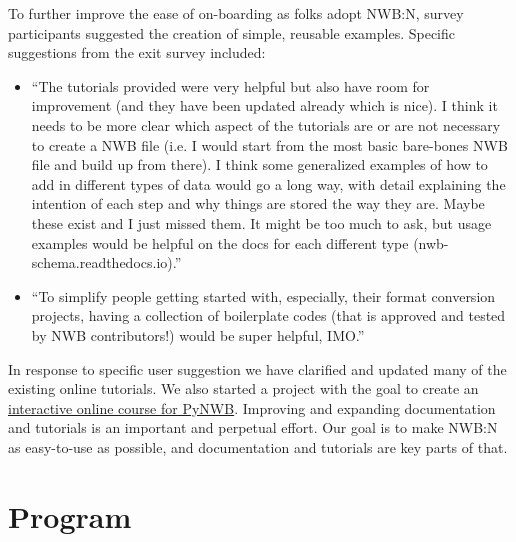 \documentclass{article}
\begin{document}
To further improve the ease of on-boarding as folks adopt NWB:N, survey participants suggested the creation of simple, reusable examples. Specific suggestions from the exit survey included:
\begin{itemize}
    \item ``The tutorials provided were very helpful but also have room for improvement (and they have been updated already which is nice). I think it needs to be more clear which aspect of the tutorials are or are not necessary to create a NWB file (i.e. I would start from the most basic bare-bones NWB file and build up from there). I think some generalized examples of how to add in different types of data would go a long way, with detail explaining the intention of each step and why things are stored the way they are. Maybe these exist and I just missed them. It might be too much to ask, but usage examples would be helpful on the docs for each different type (nwb-schema.readthedocs.io).''
    \item ``To simplify people getting started with, especially, their format conversion projects, having a collection of boilerplate codes (that is approved and tested by NWB contributors!) would be super helpful, IMO.''
\end{itemize}

In response to specific user suggestion we have clarified and updated many of the existing online tutorials. We also started a project with the goal to create an \href{https://neurodatawithoutborders.github.io/nwb_hackathons/HCK06_2019_Janelia/projects/Interactive_PyNWB_Course/}{interactive online course for PyNWB}. Improving and expanding documentation and tutorials is an important and perpetual effort. Our goal is to make NWB:N as easy-to-use as possible, and documentation and tutorials are key parts of that. 

\clearpage

\section{Program}
\label{sec:program}
\end{document}
